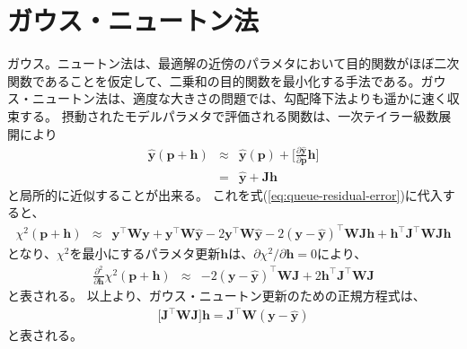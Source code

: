 \documentclass[titlepage]{jsreport}
\begin{document}
\section{ガウス・ニュートン法}\label{principle-sec:gauss-newton}
ガウス。ニュートン法は、最適解の近傍のパラメタにおいて目的関数がほぼ二次関数であることを仮定して\cite{gauss-newton-objective-function}、二乗和の目的関数を最小化する手法である。ガウス・ニュートン法は、適度な大きさの問題では、勾配降下法よりも遥かに速く収束する\cite{gauss-newton}。
摂動されたモデルパラメタで評価される関数は、一次テイラー級数展開により
\large
\begin{eqnarray}
\hat{\bm{y}}(\bm{p}+\bm{h})&\approx&\hat{\bm{y}}(\bm{p})+\Bigg[\frac{\partial\hat{\bm{y}}}{\partial\bm{p}}\bm{h}\Bigg] \nonumber\\
                           &=&\hat{\bm{y}}+\bm{J}\bm{h} \label{gauss-newton_model-parameter}
\end{eqnarray}
\normalsize
と局所的に近似することが出来る。
これを式(\ref{eq:queue-residual-error})に代入すると、
\large
\begin{eqnarray}
\chi^2(\bm{p}+\bm{h}) &\approx& \bm{y}^\top\bm{W}\bm{y}+\bm{y}^\top\bm{W}\hat{\bm{y}}-2\bm{y}^\top\bm{W}\hat{\bm{y}}-2(\bm{y}-\bm{\hat{y}})^\top\bm{W}\bm{J}\bm{h}+\bm{h}^\top\bm{J}^\top\bm{W}\bm{J}\bm{h}
\end{eqnarray}
\normalsize
となり、$\chi^2$を最小にするパラメタ更新$\bm{h}$は、${\partial\chi^2}/{\partial\bm{h}}=0$により、
\large
\begin{eqnarray}
\frac{\partial^2}{\partial\bm{h}}\chi^2(\bm{p}+\bm{h}) &\approx& -2(\bm{y}-\bm{\hat{y}})^\top\bm{W}\bm{J}+2\bm{h}^\top\bm{J}^\top\bm{W}\bm{J}
\end{eqnarray}
\normalsize
と表される。
以上より、ガウス・ニュートン更新のための正規方程式は、
\large
\begin{eqnarray}
\Big[\bm{J}^\top\bm{W}\bm{J}\Big]\bm{h} = \bm{J}^\top\bm{W}(\bm{y}-\bm{\hat{y}})
\end{eqnarray}
\normalsize
と表される\cite{gradient-descent_gauss-newton_levenberg-marquardt}。
\end{document}
